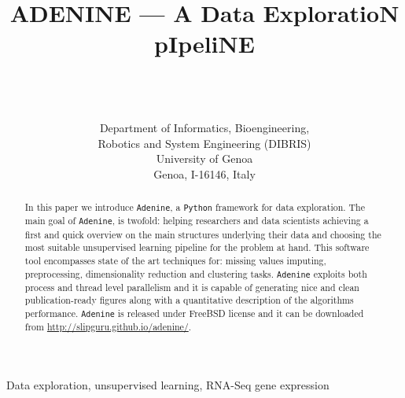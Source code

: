\documentclass[twoside,11pt]{article}
\makeatletter
\newcommand{\ade}{\texttt{Adenine}\@\xspace}
\newcommand{\py}{\texttt{Python}\@\xspace}
\makeatother
\begin{document}
\title{ADENINE --- A Data ExploratioN pIpeliNE}

\author{ \\
 \\
 \\[1em]
\addr Department of Informatics, Bioengineering, \\Robotics and System Engineering (DIBRIS)\\
     University of Genoa\\
     Genoa, I-16146, Italy}



\maketitle

\begin{abstract}

In this paper we introduce \ade, a \py framework for data exploration. The main goal of \ade, is twofold: helping researchers and data scientists achieving a first and quick overview on the main structures underlying their data and choosing the most suitable unsupervised learning pipeline for the problem at hand. This software tool encompasses state of the art techniques for: missing values imputing, preprocessing, dimensionality reduction and clustering tasks.
\ade exploits both process and thread level parallelism and it is capable of generating nice and clean publication-ready figures along with a quantitative description of the algorithms performance. \ade is released under FreeBSD license and it can be downloaded from \href{http://slipguru.github.io/adenine/}{http://slipguru.github.io/adenine/}.


\end{abstract}

\begin{keywords}
Data exploration, unsupervised learning, RNA-Seq gene expression
\end{keywords}
\end{document}
